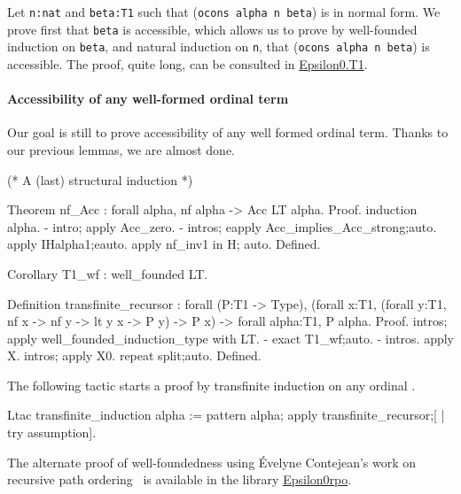 Let \texttt{n:nat} and \texttt{beta:T1} such that (\texttt{ocons alpha n beta}) is in normal form. 
We prove first that \texttt{beta} is accessible,  which allows us to prove by well-founded induction on \texttt{beta}, 
and natural induction on \texttt{n}, that (\texttt{ocons alpha n beta}) is accessible.
The proof, quite long, can be consulted in \href{../theories/html/hydras.Epsilon0.T1.html}{Epsilon0.T1}.

\paragraph{Accessibility of any well-formed ordinal term}
\label{sec:orgheadline80}

Our goal is still to prove accessibility of any well formed ordinal term.
Thanks to our previous lemmas, we are almost done.

\begin{Coqsrc}
(* A (last) structural induction *)

Theorem nf_Acc : forall alpha, nf alpha -> Acc LT  alpha.
Proof.
 induction alpha.
-  intro; apply Acc_zero.
 -  intros; eapply Acc_implies_Acc_strong;auto.
    apply IHalpha1;eauto.
    apply nf_inv1 in H; auto. 
Defined.

Corollary T1_wf : well_founded LT.
\end{Coqsrc}


\begin{Coqsrc}

Definition transfinite_recursor :
 forall (P:T1 -> Type),
   (forall x:T1, 
     (forall y:T1, nf x -> nf y ->  lt y  x -> P y) -> P x) ->
    forall alpha:T1, P alpha.
Proof.
 intros; apply well_founded_induction_type with LT.
 -  exact T1_wf;auto.
 - intros. apply X. intros; apply X0. repeat split;auto. 
Defined.
\end{Coqsrc}

The following tactic starts a proof by  transfinite induction on any ordinal .

\begin{Coqsrc}
Ltac transfinite_induction alpha :=
  pattern alpha; apply transfinite_recursor;[ | try assumption].
\end{Coqsrc}


\begin{remark}
\label{remark:a3pat}
The alternate proof of well-foundedness using \'Evelyne Contejean's work on recursive path ordering~\cite{DershowitzRPO, a3pat} is available in the library \href{../theories/html/hydras.Epsilon0.Epsilon0rpo.html}{Epsilon0rpo}.
 \end{remark}


